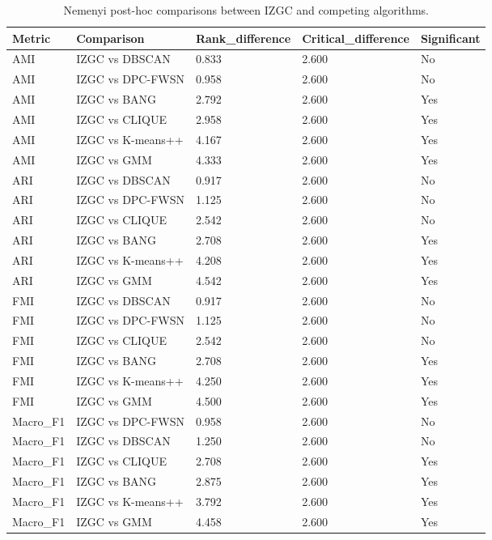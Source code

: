 
\begin{table}[ht]
\centering
\caption{
Nemenyi post-hoc comparisons between IZGC and competing algorithms.
}
\label{
tab:S3_nemenyi
}

\scriptsize

\begin{tabular}{lllll}

\toprule
Metric & Comparison & Rank_difference & Critical_difference & Significant\\

\midrule
AMI & IZGC vs DBSCAN & 0.833 & 2.600 & No\\
AMI & IZGC vs DPC-FWSN & 0.958 & 2.600 & No\\
AMI & IZGC vs BANG & 2.792 & 2.600 & Yes\\
AMI & IZGC vs CLIQUE & 2.958 & 2.600 & Yes\\
AMI & IZGC vs K-means++ & 4.167 & 2.600 & Yes\\
AMI & IZGC vs GMM & 4.333 & 2.600 & Yes\\
ARI & IZGC vs DBSCAN & 0.917 & 2.600 & No\\
ARI & IZGC vs DPC-FWSN & 1.125 & 2.600 & No\\
ARI & IZGC vs CLIQUE & 2.542 & 2.600 & No\\
ARI & IZGC vs BANG & 2.708 & 2.600 & Yes\\
ARI & IZGC vs K-means++ & 4.208 & 2.600 & Yes\\
ARI & IZGC vs GMM & 4.542 & 2.600 & Yes\\
FMI & IZGC vs DBSCAN & 0.917 & 2.600 & No\\
FMI & IZGC vs DPC-FWSN & 1.125 & 2.600 & No\\
FMI & IZGC vs CLIQUE & 2.542 & 2.600 & No\\
FMI & IZGC vs BANG & 2.708 & 2.600 & Yes\\
FMI & IZGC vs K-means++ & 4.250 & 2.600 & Yes\\
FMI & IZGC vs GMM & 4.500 & 2.600 & Yes\\
Macro_F1 & IZGC vs DPC-FWSN & 0.958 & 2.600 & No\\
Macro_F1 & IZGC vs DBSCAN & 1.250 & 2.600 & No\\
Macro_F1 & IZGC vs CLIQUE & 2.708 & 2.600 & Yes\\
Macro_F1 & IZGC vs BANG & 2.875 & 2.600 & Yes\\
Macro_F1 & IZGC vs K-means++ & 3.792 & 2.600 & Yes\\
Macro_F1 & IZGC vs GMM & 4.458 & 2.600 & Yes\\

\end{tabular}
\end{table}
